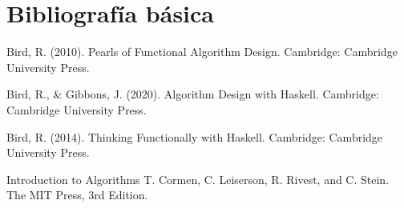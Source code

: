 \documentclass[letterpaper,10pt]{article}
\begin{document}
\section{Bibliografía básica}

\begin{enumerate}[label={[\arabic*]}]
\item Bird, R. (2010). Pearls of Functional Algorithm Design. Cambridge: Cambridge University Press.
\item Bird, R., \& Gibbons, J. (2020). Algorithm Design with Haskell. Cambridge: Cambridge University Press.
\item Bird, R. (2014). Thinking Functionally with Haskell. Cambridge: Cambridge University Press.
\item Introduction to Algorithms T. Cormen, C. Leiserson, R. Rivest, and C. Stein. The MIT Press, 3rd Edition.
\end{enumerate}
\end{document}
